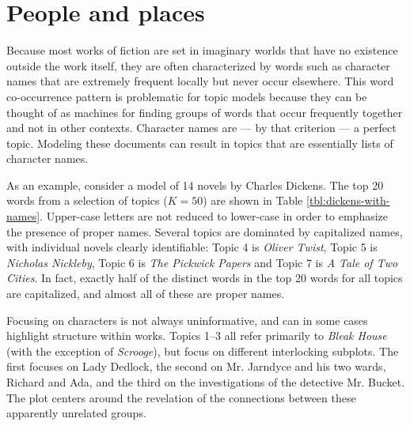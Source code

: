 
\section{People and places}

Because most works of fiction are set in imaginary worlds that have no existence outside the work itself, they are often characterized by words such as character names that are extremely frequent locally but never occur elsewhere. 
This word co-occurrence pattern is problematic for topic models because they can be thought of as machines for finding groups of words that occur frequently together and not in other contexts.
Character names are --- by that criterion --- a perfect topic.
Modeling these documents can result in topics that are essentially lists of character names.

As an example, consider a model of 14 novels by Charles Dickens. 
The top 20 words from a selection of topics ($K=50$) are shown in Table \ref{tbl:dickens-with-names}.
Upper-case letters are not reduced to lower-case in order to emphasize the presence of proper names.
Several topics are dominated by capitalized names, with individual novels clearly identifiable: Topic 4 is {\em Oliver Twist}, Topic 5 is {\em Nicholas Nickleby}, Topic 6 is {\em The Pickwick Papers} and Topic 7 is {\em A Tale of Two Cities}.
In fact, exactly half of the distinct words in the top 20 words for all topics are capitalized, and almost all of these are proper names.

Focusing on characters is not always uninformative, and can in some cases highlight structure within works.
Topics 1--3 all refer primarily to {\em Bleak House} (with the exception of {\em Scrooge}), but focus on different interlocking subplots.
The first focuses on Lady Dedlock, the second on Mr. Jarndyce and his two wards, Richard and Ada, and the third on the investigations of the detective Mr. Bucket.
The plot centers around the revelation of the connections between these apparently unrelated groups.

